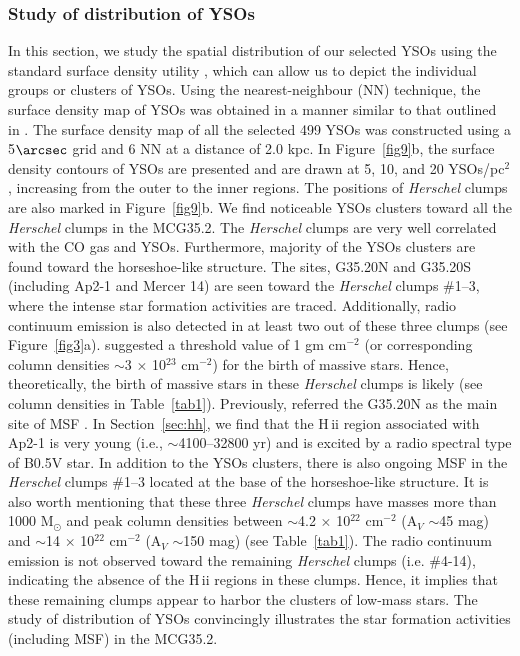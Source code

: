 \documentclass[iop]{emulateapj}
\begin{document}
\subsubsection{Study of distribution of YSOs}
\label{subsec:surfden}
%
In this section, we study the spatial distribution of our selected YSOs using the standard surface density utility \citep[see][for more details]{gutermuth09,bressert10,dewangan11,dewangan15}, which can allow us to depict the individual groups or clusters of YSOs.
Using the nearest-neighbour (NN) technique, the surface density map of YSOs was obtained 
in a manner similar to that outlined in \citet{dewangan15} \citep[also see equation in][]{dewangan15}.  
The surface density map of all the selected 499 YSOs was constructed using 
a 5$\arcsec$ grid and 6 NN at a distance of 2.0 kpc. 
In Figure~\ref{fig9}b, the surface density contours of YSOs are presented and are drawn at 5, 10, 
and 20 YSOs/pc$^{2}$, increasing from the outer to the inner regions. 
The positions of {\it Herschel} clumps are also marked in Figure~\ref{fig9}b. 
We find noticeable YSOs clusters toward all the {\it Herschel} clumps in the MCG35.2. 
The {\it Herschel} clumps are very well correlated with the CO gas and YSOs. 
Furthermore, majority of the YSOs clusters are found toward the horseshoe-like structure.
The sites, G35.20N and G35.20S (including Ap2-1 and Mercer 14) are seen toward the {\it Herschel} clumps \#1--3, 
where the intense star formation activities are traced. Additionally, radio continuum emission is also detected in at least two out of these three clumps (see Figure~\ref{fig3}a).
\citet{krumholz08} suggested a threshold value of 1 gm cm$^{-2}$ (or corresponding column densities $\sim$3 $\times$ 10$^{23}$ cm$^{-2}$) 
for the birth of massive stars. Hence, theoretically, the birth of massive stars in these {\it Herschel} clumps is likely (see column densities in Table~\ref{tab1}). 
Previously, 
\citet{sanchez14} referred the G35.20N as the main site of MSF \citep[also see][]{beltran16}. 
In Section~\ref{sec:hh}, we find that the H\,{\sc ii} region associated with Ap2-1 is very young (i.e., $\sim$4100--32800 yr) and is excited by a radio spectral type of B0.5V star.
In addition to the YSOs clusters, there is also ongoing MSF in the {\it Herschel} clumps \#1--3 located at the base of the horseshoe-like structure. 
It is also worth mentioning that these three {\it Herschel} clumps have masses more than 1000 M$_{\odot}$ and 
peak column densities between $\sim$4.2 $\times$ 10$^{22}$ cm$^{-2}$ (A$_{V}$ $\sim$45 mag) and 
$\sim$14 $\times$ 10$^{22}$ cm$^{-2}$ (A$_{V}$ $\sim$150 mag) (see Table~\ref{tab1}). 
The radio continuum emission is not observed toward the remaining {\it Herschel} clumps (i.e. \#4-14), 
indicating the absence of the H\,{\sc ii} regions in these clumps. Hence, it implies that these remaining clumps 
appear to harbor the clusters of low-mass stars. 
The study of distribution of YSOs convincingly illustrates the star formation activities (including MSF) in the MCG35.2. 
%
\end{document}
